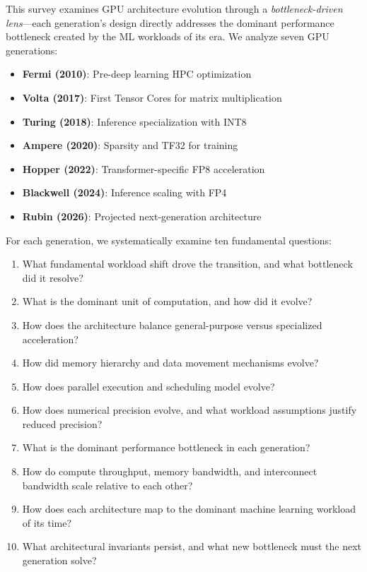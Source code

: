 \documentclass{article}
\begin{document}
This survey examines GPU architecture evolution through a \textit{bottleneck-driven lens}—each generation's design directly addresses the dominant performance bottleneck created by the ML workloads of its era. We analyze seven GPU generations:

\begin{itemize}
\item \textbf{Fermi (2010)}: Pre-deep learning HPC optimization
\item \textbf{Volta (2017)}: First Tensor Cores for matrix multiplication
\item \textbf{Turing (2018)}: Inference specialization with INT8
\item \textbf{Ampere (2020)}: Sparsity and TF32 for training
\item \textbf{Hopper (2022)}: Transformer-specific FP8 acceleration
\item \textbf{Blackwell (2024)}: Inference scaling with FP4
\item \textbf{Rubin (2026)}: Projected next-generation architecture
\end{itemize}

For each generation, we systematically examine ten fundamental questions:
\begin{enumerate}
\item What fundamental workload shift drove the transition, and what bottleneck did it resolve?
\item What is the dominant unit of computation, and how did it evolve?
\item How does the architecture balance general-purpose versus specialized acceleration?
\item How did memory hierarchy and data movement mechanisms evolve?
\item How does parallel execution and scheduling model evolve?
\item How does numerical precision evolve, and what workload assumptions justify reduced precision?
\item What is the dominant performance bottleneck in each generation?
\item How do compute throughput, memory bandwidth, and interconnect bandwidth scale relative to each other?
\item How does each architecture map to the dominant machine learning workload of its time?
\item What architectural invariants persist, and what new bottleneck must the next generation solve?
\end{enumerate}
\end{document}
